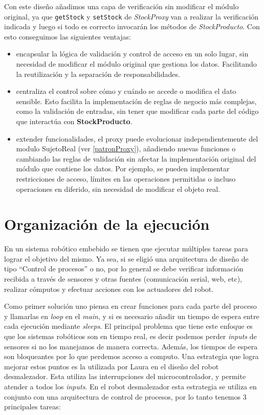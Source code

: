 Con este diseño añadimos una capa de verificación sin modificar el módulo original, ya que \verb|getStock| y \verb|setStock| de \textit{StockProxy} van a realizar la verificación indicada y luego si todo es correcto invocarán los métodos de \textit{StockProducto}. Con esto conseguimos las siguientes ventajas:

\begin{itemize}
    \item encapsular la lógica de validación y control de acceso en un solo lugar, sin necesidad de modificar el módulo original que gestiona los datos. Facilitando la reutilización y la separación de responsabilidades.

    \item centraliza el control sobre cómo y cuándo se accede o modifica el dato sensible. Esto facilita la implementación de reglas de negocio más complejas, como la validación de entradas, sin tener que modificar cada parte del código que interactúa con \textbf{StockProducto}.

    \item extender funcionalidades, el proxy puede evolucionar independientemente del modulo SujetoReal (ver \ref{patronProxy}), añadiendo nuevas funciones o cambiando las reglas de validación sin afectar la implementación original del módulo que contiene los datos. Por ejemplo, se pueden implementar restricciones de acceso, límites en las operaciones permitidas o incluso operaciones en diferido, sin necesidad de modificar el objeto real.
\end{itemize}

\section{Organización de la ejecución}

En un sistema robótico embebido se tienen que ejecutar múltiples tareas para lograr el objetivo del mismo. Ya sea, si se eligió una arquitectura de diseño de tipo ``Control de procesos'' o no, por lo general se debe verificar información recibida a través de sensores y otras fuentes (comunicación serial, web, etc), realizar cómputos y efectuar acciones con los actuadores del robot.

Como primer solución uno piensa en crear funciones para cada parte del proceso y llamarlas en \textit{loop} en el \textit{main}, y si es necesario añadir un tiempo de espera entre cada ejecución mediante \textit{sleeps}. El principal problema que tiene este enfoque es que los sistemas robóticos son en tiempo real, es decir podemos perder \textit{inputs} de sensores si no los manejamos de manera correcta. Además, los tiempos de espera son bloqueantes por lo que perdemos acceso a computo. Una estrategia que logra mejorar estos puntos es la utilizada por Laura en el diseño del robot desmalezador. Esta utiliza las interrupciones del microcontrolador, y permite atender a todos los \textit{inputs}. En el robot desmalezador esta estrategia se utiliza en conjunto con una arquitectura de control de procesos, por lo tanto tenemos 3 principales tareas:

